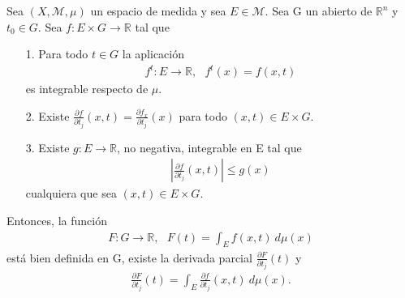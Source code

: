 \begin{teo}
Sea $(X, \mathcal{M}, \mu)$ un espacio de medida y sea $E \in \mathcal{M}$. Sea G un abierto de $\mathbb{R}^n$ y $t_0 \in G$. Sea $f: E \times G \longrightarrow \mathbb{R}$ tal que
\begin{enumerate}
    \item[1.] Para todo $t \in G$ la aplicación
    \begin{align*}
        f^t: E \longrightarrow \mathbb{R}, \ \ \ f^t(x) = f(x,t)
    \end{align*}
    es integrable respecto de $\mu$.
    \item[2.] Existe $\frac{\partial  f}{\partial t_j}(x,t) = \frac{\partial f_x}{\partial t_j}(x)$ para todo $(x,t) \in E \times G$.
    \item[3.] Existe $g: E \longrightarrow \mathbb{R}$, no negativa, integrable en E tal que
    \begin{align*}
        \left| \frac{\partial f}{\partial t_j}(x,t) \right| \leq g(x)
    \end{align*}
    cualquiera que sea $(x,t) \in E \times G$.
\end{enumerate}
Entonces, la función
\begin{align*}
    F: G \longrightarrow \mathbb{R}, \ \ \ F(t) = \int_{E}{f(x,t) \ d\mu(x)}
\end{align*}
está bien definida en G, existe la derivada parcial $\frac{\partial F}{\partial t_j}(t)$ y
\begin{align*}
    \frac{\partial F}{\partial t_j}(t) = \int_{E}{\frac{\partial f}{\partial t_j}(x,t) \ d\mu(x)}.
\end{align*}
\end{teo}

